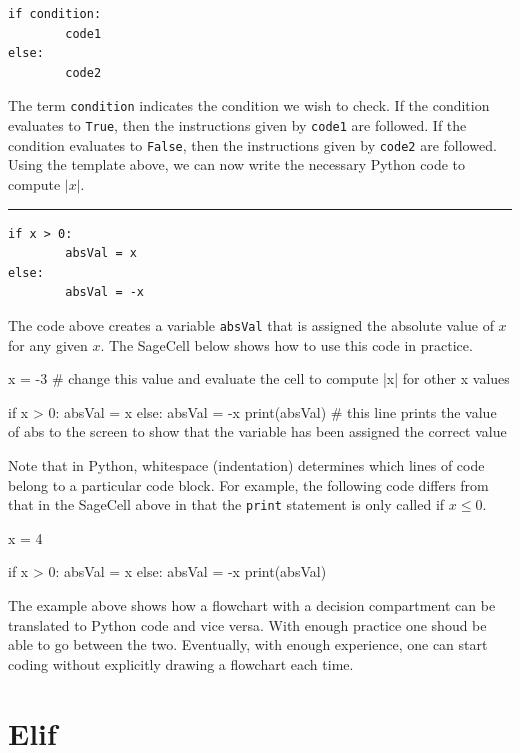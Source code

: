 \documentclass{ximera}
\begin{document}
\begin{verbatim}
if condition:
        code1
else:
        code2
\end{verbatim}

The term \verb|condition| indicates the condition we wish to check. If the condition evaluates to \verb|True|, then the instructions given by \verb|code1| are followed. If the condition evaluates to \verb|False|, then the instructions given by \verb|code2| are followed. Using the template above, we can now write the necessary Python code to compute $|x|$.
      
\noindent\rule{\textwidth}{1pt}    
\begin{verbatim}
if x > 0:
        absVal = x
else:
        absVal = -x
\end{verbatim}

The code above creates a variable \verb|absVal| that is assigned the absolute value of $x$ for any given $x$. The SageCell below shows how to use this code in practice.

\begin{sageCell}
x = -3               # change this value and evaluate the cell to compute |x| for other x values

if x > 0:
	absVal = x
else:
	absVal = -x
print(absVal)        # this line prints the value of abs to the screen to show that the variable has been assigned the correct value
\end{sageCell}

Note that in Python, whitespace (indentation) determines which lines of code belong to a particular code block. For example, the following code differs from that in the SageCell above in that the \verb|print| statement is only called if $x\leq 0$.

\begin{sageCell}
x = 4

if x > 0:
	absVal = x
else:
	absVal = -x
	print(absVal)
\end{sageCell}

The example above shows how a flowchart with a decision compartment can be translated to Python code and vice versa. With enough practice one shoud be able to go between the two. Eventually, with enough experience, one can start coding without explicitly drawing a flowchart each time.

\section{Elif}
\end{document}
